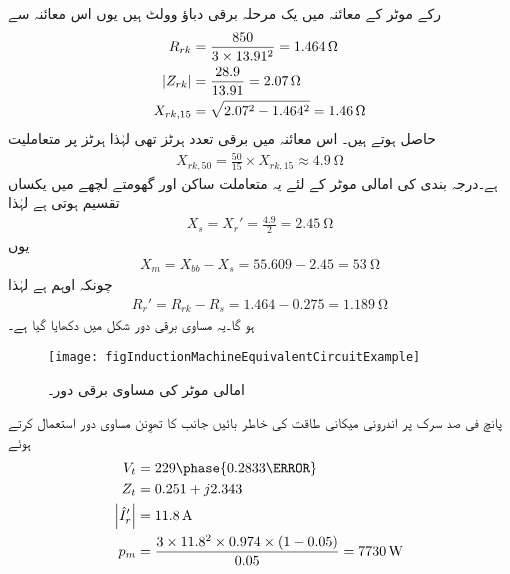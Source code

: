 رکے موٹر کے معائنہ میں یک مرحلہ برقی دباؤ  وولٹ ہیں یوں اس معائنہ سے
\begin{align*}
R_{rk}&=\frac{850}{3 \times 13.91^2}=\SI{1.464}{\ohm}\\
\abs{Z_{rk}}&=\frac{28.9}{13.91}=\SI{2.07}{\ohm}\\
X_{rk, 15}&=\sqrt{2.07^2-1.464^2}=\SI{1.46}{\ohm}
\end{align*}
حاصل ہوتے ہیں۔ اس معائنہ میں برقی تعدد  ہرٹز تھی لہٰذا  ہرٹز پر متعاملیت
\begin{align*}
X_{rk,50}=\frac{50}{15} \times X_{rk,15} \approx \SI{4.9}{\ohm}
\end{align*}
ہے۔درجہ بندی  کی امالی موٹر کے لئے یہ متعاملت ساکن اور گھومتے لچھے میں یکساں تقسیم ہوتی ہے لہٰذا
\begin{align*}
X_s=X_r'=\frac{4.9}{2}=\SI{2.45}{\ohm}
\end{align*}
یوں
\begin{align*}
X_m=X_{bb}-X_s=55.609-2.45=\SI{53}{\ohm}
\end{align*}
چونکہ   اوہم ہے  لہٰذا
\begin{align*}
R_r'=R_{rk}-R_s=1.464-0.275=\SI{1.189}{\ohm}
\end{align*}
ہو گا۔یہ مساوی برقی دور شکل  میں دکھایا گیا ہے۔
\begin{figure}
\centering
\texttt{[image: figInductionMachineEquivalentCircuitExample]}
\caption{امالی موٹر کی مساوی برقی دور۔}
\label{شکل_امالی_موٹر_مثال_کا_دور}
\end{figure}

پانچ فی صد سرک پر اندرونی میکانی طاقت کی خاطر بائیں جانب کا تھوِنن مساوی دور استعمال کرتے ہوئے 
\begin{align*}
V_t&=229 \phase{0.2833 \degree}\\
Z_t&=0.251+j2.343\\
\abs{\hat{I}_r'}&=\SI{11.8}{\ampere}\\
p_m&=\frac{3 \times 11.8^2 \times 0.974 \times (1-0.05)}{0.05}=\SI{7730}{\watt}
\end{align*}

